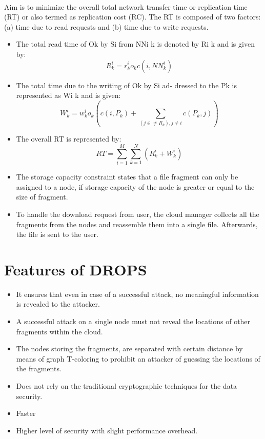 \paragraph*{}
Aim is to minimize the overall total network transfer time or replication time (RT)
or also termed as replication cost (RC). The RT is composed of two factors: (a) time due
to read requests and (b) time due to write requests.

\begin{itemize}
	\item The total read time of Ok by Si from NNi k is denoted by Ri k and is given by:
	$$ R_{k}^{i} = r_{k}^{i}o_{k}c(i , N N_{k}^{i})$$
	\item The total time due to the writing of Ok by Si ad- dressed to the Pk is represented as Wi
	k and is given:
	\[
	W_{k}^{i} = w_{k}^{i}o_{k}(c(i, P_{k})+ \sum_{ (j \in\neq R_{k}) , j \neq i} c(P_{k}, j))
	\]
	\item The overall RT is represented by:
	\[
	RT = \sum_{i = 1}^{M} \sum_{ k = 1}^{N} (R_{k}^{i} + W_{k}^{i})
	\]
	\item The storage capacity constraint states that a file fragment can only be assigned to a
	node, if storage capacity of the node is greater or equal to the size of fragment.
	\item To handle the download request from user, the cloud manager collects all the fragments from the nodes and reassemble them into a single file. Afterwards, the file is sent to the
	user.
\end{itemize}
\section{Features of DROPS}
\begin{itemize}
	\item It ensures that even in case of a successful attack, no meaningful information is revealed
	to the attacker.
	\item A successful attack on a single node must not reveal the locations of other fragments
	within the cloud.
	\item The nodes storing the fragments, are separated with certain distance by means of graph
	T-coloring to prohibit an attacker of guessing the locations of the fragments.
	\item Does not rely on the traditional cryptographic techniques for the data security.
	\item Faster
	\item Higher level of security with slight performance overhead.
\end{itemize}
